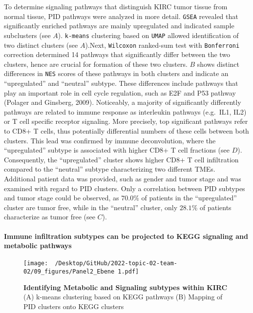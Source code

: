 \documentclass[
  parskip,
  oneside]{\documentclass[oneside]{book}}
\begin{document}
To determine signaling pathways that distinguish KIRC tumor tissue from
normal tissue, PID pathways were analyzed in more detail. \texttt{GSEA}
revealed that significantly enriched pathways are mainly upregulated and
indicated sample subclusters (see  \(A\)). \texttt{k-means}
clustering based on \texttt{UMAP} allowed identification of two distinct
clusters (see  \(A\)).Next, \texttt{Wilcoxon} ranked-sum test
with \texttt{Bonferroni} correction determined 14 pathways that
significantly differ between the two clusters, hence are crucial for
formation of these two clusters. \(B\) shows distinct
differences in \texttt{NES} scores of these pathways in both clusters
and indicate an ``upregulated'' and ``neutral'' subtype. These
differences include pathways that play an important role in cell cycle
regulation, such as E2F and P53 pathway (Polager and Ginsberg, 2009).
Noticeably, a majority of significantly differently pathways are related
to immune response as interleukin pathways (e.g.~IL1, IL2) or T cell
specific receptor signaling. More precisely, top significant pathways
refer to CD8+ T cells, thus potentially differential numbers of these
cells between both clusters. This lead was confirmed by immune
deconvolution, where the ``upregulated'' subtype is associated with
higher CD8+ T cell fractions (see  \(D\)). Consequently, the
``upregulated'' cluster shows higher CD8+ T cell infiltration compared
to the ``neutral'' subtype characterizing two different TMEs.\\
Additional patient data was provided, such as gender and tumor stage and
was examined with regard to PID clusters. Only a correlation between PID
subtypes and tumor stage could be observed, as \(70.0\%\) of patients in
the ``upregulated'' cluster are tumor free, while in the ``neutral''
cluster, only \(28.1\%\) of patients characterize as tumor free (see
 \(C\)).

\hypertarget{immune-infiltration-subtypes-can-be-projected-to-kegg-signaling-and-metabolic-pathways}{%
\paragraph{Immune infiltration subtypes can be projected to KEGG
signaling and metabolic
pathways}\label{immune-infiltration-subtypes-can-be-projected-to-kegg-signaling-and-metabolic-pathways}}

\begin{figure}[h]
  \texttt{[image: ~/Desktop/GitHub/2022-topic-02-team-02/09\_figures/Panel2\_Ebene 1.pdf]}
  \caption{\textbf{Identifying Metabolic and Signaling subtypes within KIRC} (A) k-means clustering based on KEGG pathways (B) Mapping of PID clusters onto KEGG clusters}
  \label{kegg}
\end{figure}
\end{document}
